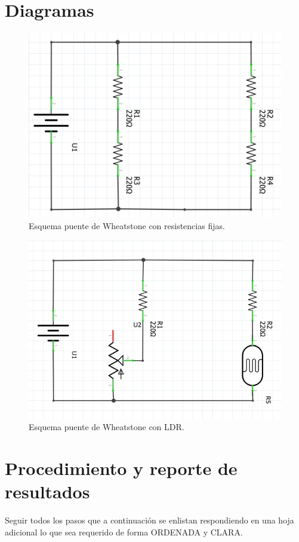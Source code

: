 \documentclass[letterpaper, 12 pt, conference]{ieeeconf}  %
\begin{document}
\section{Diagramas}

\begin{figure}[h!]
    \centering
    \includegraphics[scale=0.5]{C1.png}
    \caption{Esquema puente de Wheatstone con resistencias fijas.}
\end{figure}

\begin{figure}[h!]
    \centering
    \includegraphics[scale=0.5]{C2.png}
    \caption{Esquema puente de Wheatstone con LDR.}
\end{figure}

\section{Procedimiento y reporte de resultados}
Seguir todos los pasos que a continuación se enlistan respondiendo en una hoja adicional lo que sea requerido de forma ORDENADA y CLARA.
\end{document}
